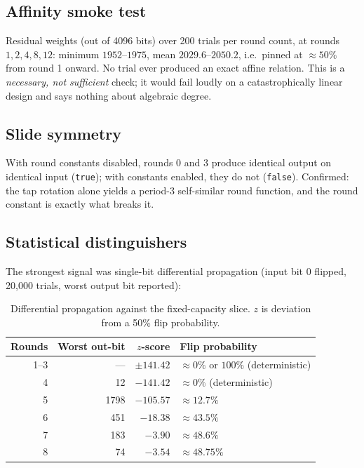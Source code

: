 \documentclass[11pt,a4paper]{article}
\theoremstyle{plain}
\theoremstyle{definition}
\theoremstyle{remark}
\begin{document}
\subsection{Affinity smoke test}

Residual weights (out of 4096 bits) over 200 trials per round count, at rounds
$1,2,4,8,12$: minimum $1952$--$1975$, mean $2029.6$--$2050.2$, i.e.\ pinned at
$\approx 50\%$ from round 1 onward. No trial ever produced an exact affine relation.
This is a \emph{necessary, not sufficient} check; it would fail loudly on a
catastrophically linear design and says nothing about algebraic degree.

\subsection{Slide symmetry}
\label{sec:res-slide}

With round constants disabled, rounds 0 and 3 produce identical output on identical
input (\texttt{true}); with constants enabled, they do not (\texttt{false}).
Confirmed: the tap rotation alone yields a period-3 self-similar round function, and
the round constant is exactly what breaks it.

\subsection{Statistical distinguishers}

The strongest signal was single-bit differential propagation (input bit 0 flipped,
20{,}000 trials, worst output bit reported):

\begin{table}[h]
\centering
\caption{Differential propagation against the fixed-capacity slice. $z$ is deviation
from a 50\% flip probability.}
\begin{tabular}{rrrl}
\toprule
Rounds & Worst out-bit & $z$-score & Flip probability \\
\midrule
1--3 & --- & $\pm141.42$ & $\approx 0\%$ or $100\%$ (deterministic) \\
4 & 12 & $-141.42$ & $\approx 0\%$ (deterministic) \\
5 & 1798 & $-105.57$ & $\approx 12.7\%$ \\
6 & 451 & $-18.38$ & $\approx 43.5\%$ \\
7 & 183 & $-3.90$ & $\approx 48.6\%$ \\
8 & 74 & $-3.54$ & $\approx 48.75\%$ \\
\bottomrule
\end{tabular}
\end{table}
\end{document}
